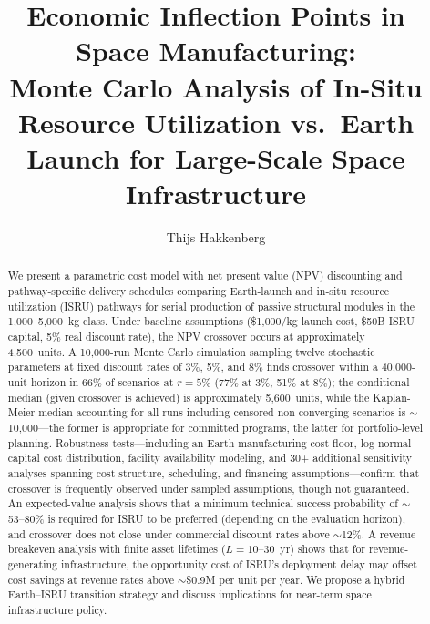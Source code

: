\documentclass[preprint,12pt]{elsarticle}
\begin{document}
\begin{frontmatter}

\title{Economic Inflection Points in Space Manufacturing:\\ Monte Carlo Analysis of In-Situ Resource Utilization vs.\ Earth Launch for Large-Scale Space Infrastructure}

\author[dyson]{Thijs Hakkenberg}

\address[dyson]{Project Dyson, Open Research Initiative}

\begin{abstract}
We present a parametric cost model with net present value (NPV) discounting and pathway-specific delivery schedules comparing Earth-launch and in-situ resource utilization (ISRU) pathways for serial production of passive structural modules in the 1{,}000--5{,}000~kg class. Under baseline assumptions (\$1{,}000/kg launch cost, \$50B ISRU capital, 5\% real discount rate), the NPV crossover occurs at approximately 4{,}500~units. A 10{,}000-run Monte Carlo simulation sampling twelve stochastic parameters at fixed discount rates of 3\%, 5\%, and 8\% finds crossover within a 40{,}000-unit horizon in 66\% of scenarios at $r = 5\%$ (77\% at 3\%, 51\% at 8\%); the conditional median (given crossover is achieved) is approximately 5{,}600~units, while the Kaplan-Meier median accounting for all runs including censored non-converging scenarios is $\sim$10{,}000---the former is appropriate for committed programs, the latter for portfolio-level planning. Robustness tests---including an Earth manufacturing cost floor, log-normal capital cost distribution, facility availability modeling, and 30+ additional sensitivity analyses spanning cost structure, scheduling, and financing assumptions---confirm that crossover is frequently observed under sampled assumptions, though not guaranteed. An expected-value analysis shows that a minimum technical success probability of $\sim$53--80\% is required for ISRU to be preferred (depending on the evaluation horizon), and crossover does not close under commercial discount rates above $\sim$12\%. A revenue breakeven analysis with finite asset lifetimes ($L = 10$--$30$~yr) shows that for revenue-generating infrastructure, the opportunity cost of ISRU's deployment delay may offset cost savings at revenue rates above $\sim$\$0.9M per unit per year. We propose a hybrid Earth--ISRU transition strategy and discuss implications for near-term space infrastructure policy.
\end{abstract}


\end{frontmatter}
\end{document}
